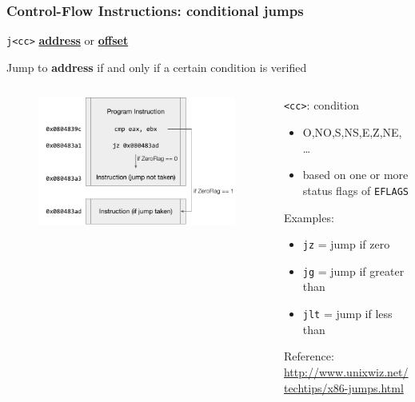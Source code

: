 \documentclass[]{beamer}
\begin{document}
\begin{frame}
  \frametitle{Control-Flow Instructions: conditional jumps}
  
  {\tt j<cc>} \underline{\textbf{address}} or \underline{\textbf{offset}}
  
  Jump to \textbf{address} if and only if a certain condition is verified
  
  \begin{columns}
    \begin{column}{2.5in}
      \begin{figure}
        \includegraphics[width=\textwidth]{images/x86-jcc.pdf}
      \end{figure}
    \end{column}
    \begin{column}{2.5in}
	
     {\tt <cc>}: condition
      	\begin{itemize}
	   \item O,NO,S,NS,E,Z,NE, \dots
            \item based on one or more status flags of {\tt EFLAGS}
      \end{itemize}
      Examples:
      	\begin{itemize}
	\item {\tt jz} = jump if zero
	\item {\tt jg} = jump if greater than
	\item {\tt jlt} = jump if less than
	\end{itemize}
      Reference: \url{http://www.unixwiz.net/techtips/x86-jumps.html}
    \end{column}
  \end{columns}
\end{frame}
\end{document}
